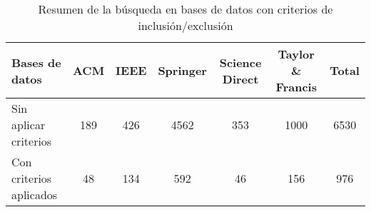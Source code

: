 \begin{table}[H]
\centering
\scriptsize
\setlength{\tabcolsep}{4pt}
\renewcommand{\arraystretch}{1.1}
\begin{tabular}{|l|c|c|c|c|c|c|}
\hline
\textbf{Bases de datos} & \textbf{ACM} & \textbf{IEEE} & \textbf{Springer} & \textbf{Science Direct} & \textbf{Taylor \& Francis} & \textbf{Total} \\
\hline
Sin aplicar criterios & 189 & 426 & 4562 & 353 & 1000 & 6530 \\
\hline
Con criterios aplicados & 48 & 134 & 592 & 46 & 156 & 976 \\
\hline
\end{tabular}
\caption{Resumen de la búsqueda en bases de datos con criterios de inclusión/exclusión}\label{tab:resumen-busqueda}
\end{table}